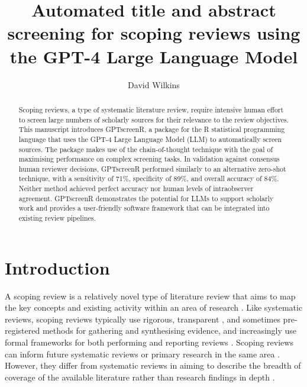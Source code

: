 \documentclass[10pt,a4paper,twocolumn]{article}
\begin{document}
\title{Automated title and abstract screening for scoping reviews using the GPT-4 Large Language Model}
\author[1]{David Wilkins}
\maketitle

\begin{abstract}
  Scoping reviews, a type of systematic literature review, require intensive human effort to screen large numbers of scholarly sources for their relevance to the review objectives. This manuscript introduces GPTscreenR, a package for the R statistical programming language that uses the GPT-4 Large Language Model (LLM) to automatically screen sources. The package makes use of the chain-of-thought technique with the goal of maximising performance on complex screening tasks. In validation against consensus human reviewer decisions, GPTscreenR performed similarly to an alternative zero-shot technique, with a sensitivity of 71\%, specificity of 89\%, and overall accuracy of 84\%. Neither method achieved perfect accuracy nor human levels of intraobserver agreement. GPTscreenR demonstrates the potential for LLMs to support scholarly work and provides a user-friendly software framework that can be integrated into existing review pipelines.
\end{abstract}

\section{Introduction}

A scoping review is a relatively novel type of literature review that aims to map the key concepts and existing activity within an area of research \cite{Arksey.2005}. Like systematic reviews, scoping reviews typically use rigorous, transparent \cite{Pham.2014}, and sometimes pre-registered methods for gathering and synthesising evidence, and increasingly use formal frameworks for both performing and reporting reviews \cite{Peters.2021}. Scoping reviews can inform future systematic reviews or primary research in the same area \cite{Sutton.2019}. However, they differ from systematic reviews in aiming to describe the breadth of coverage of the available literature rather than research findings in depth \cite{Arksey.2005}.
\end{document}
